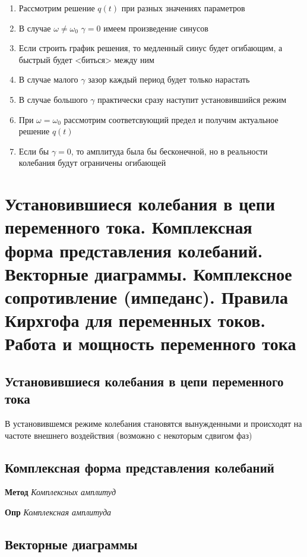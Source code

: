 \documentclass[a4paper, 14pt]{article}
\begin{document}
    \begin{enumerate}
        \item Рассмотрим решение $q(t)$ при разных значениях параметров
        \item В случае $\omega \neq \omega_0$ $\gamma = 0$ имеем произведение синусов
        \item Если строить график решения, то медленный синус будет огибающим, а быстрый будет <биться> между ним
        \item В случае малого $\gamma$ зазор каждый период будет только нарастать
        \item В случае большого $\gamma$ практически сразу наступит установившийся режим
        \item При $\omega = \omega_0$ рассмотрим соответсвующий предел и получим актуальное решение $q(t)$
        \item Если бы $\gamma = 0$, то амплитуда была бы бесконечной, но в реальности колебания будут ограничены
        огибающей
    \end{enumerate}
    
    \section{Установившиеся колебания в цепи переменного тока.
    Комплексная форма представления колебаний.
    Векторные диаграммы.
    Комплексное сопротивление (импеданс).
    Правила Кирхгофа для переменных токов.
    Работа и мощность переменного тока}
    
    \subsection{Установившиеся колебания в цепи переменного тока}
    
    В установившемся режиме колебания становятся вынужденными и происходят на частоте внешнего воздействия (возможно с
    некоторым сдвигом фаз)
    
    \subsection{Комплексная форма представления колебаний}
    
    \textbf{Метод} \textit{Комплексных амплитуд}
    
    \textbf{Опр} \textit{Комплексная амплитуда}
    
    \subsection{Векторные диаграммы}
    
\end{document}
